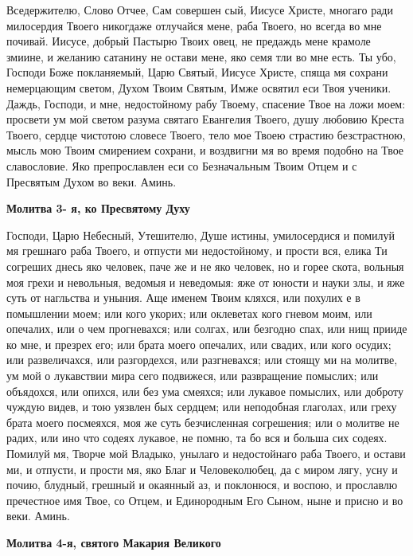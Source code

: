 Вседержителю, Слово Отчее, Сам совершен сый, Иисусе Христе, многаго ради милосердия Твоего никогдаже отлучайся мене, раба Твоего, но всегда во мне почивай. Иисусе, добрый Пастырю Твоих овец, не предаждь мене крамоле змиине, и желанию сатанину не остави мене, яко семя тли во мне есть. Ты убо, Господи Боже покланяемый, Царю Святый, Иисусе Христе, спяща мя сохрани немерцающим светом, Духом Твоим Святым, Имже освятил еси Твоя ученики. Даждь, Господи, и мне, недостойному рабу Твоему, спасение Твое на ложи моем: просвети ум мой светом разума святаго Евангелия Твоего, душу любовию Креста Твоего, сердце чистотою словесе Твоего, тело мое Твоею страстию безстрастною, мысль мою Твоим смирением сохрани, и воздвигни мя во время подобно на Твое славословие. Яко препрославлен еси со Безначальным Твоим Отцем и с Пресвятым Духом во веки. Аминь.




\medskip
\bfseries Молитва 3- я, ко Пресвятому Духу\normalfont{}


Господи, Царю Небесный, Утешителю, Душе истины, умилосердися и помилуй мя грешнаго раба Твоего, и отпусти ми недостойному, и прости вся, елика Ти согреших днесь яко человек, паче же и не яко человек, но и горее скота, вольныя моя грехи и невольныя, ведомыя и неведомыя: яже от юности и науки злы, и яже суть от нагльства и уныния. Аще именем Твоим кляхся, или похулих е в помышлении моем; или кого укорих; или оклеветах кого гневом моим, или опечалих, или о чем прогневахся; или солгах, или безгодно спах, или нищ прииде ко мне, и презрех его; или брата моего опечалих, или свадих, или кого осудих; или развеличахся, или разгордехся, или разгневахся; или стоящу ми на молитве, ум мой о лукавствии мира сего подвижеся, или развращение помыслих; или объядохся, или опихся, или без ума смеяхся; или лукавое помыслих, или доброту чуждую видев, и тою уязвлен бых сердцем; или неподобная глаголах, или греху брата моего посмеяхся, моя же суть безчисленная согрешения; или о молитве не радих, или ино что содеях лукавое, не помню, та бо вся и больша сих содеях. Помилуй мя, Творче мой Владыко, унылаго и недостойнаго раба Твоего, и остави ми, и отпусти, и прости мя, яко Благ и Человеколюбец, да с миром лягу, усну и почию, блудный, грешный и окаянный аз, и поклонюся, и воспою, и прославлю пречестное имя Твое, со Отцем, и Единородным Его Сыном, ныне и присно и во веки. Аминь.


\medskip
\bfseries Молитва 4-я, святого Макария Великого\normalfont{}


